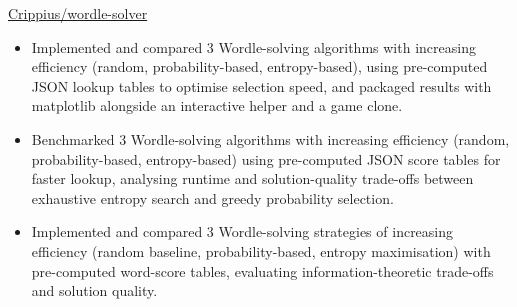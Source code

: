  {}
{
}
{\href{https://github.com/Crippius/wordle-solver}
{Crippius/wordle-solver}}
\begin{itemize}

    \ifde
        \item Implemented and compared 3 Wordle-solving algorithms with increasing efficiency (random, probability-based, entropy-based), using pre-computed JSON lookup tables to optimise selection speed, and packaged results with matplotlib alongside an interactive helper and a game clone.
    \else
        \ifhpc
            \item Benchmarked 3 Wordle-solving algorithms with increasing efficiency (random, probability-based, entropy-based) using pre-computed JSON score tables for faster lookup, analysing runtime and solution-quality trade-offs between exhaustive entropy search and greedy probability selection.
        \else
            \item Implemented and compared 3 Wordle-solving strategies of increasing efficiency (random baseline, probability-based, entropy maximisation) with pre-computed word-score tables, evaluating information-theoretic trade-offs and solution quality.
        \fi
    \fi

\end{itemize}

\medskip
